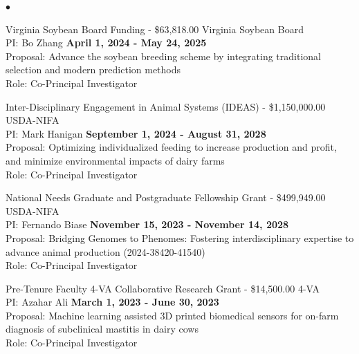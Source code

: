 \documentclass[margin,line,10pt]{res}
\newenvironment{list2}{
  \begin{list}{$\bullet$}{%
      \setlength{\itemsep}{0in}
      \setlength{\parsep}{0in} \setlength{\parskip}{0in}
      \setlength{\topsep}{0in} \setlength{\partopsep}{0in} 
      \setlength{\leftmargin}{0.2in}}}{\end{list}}
\begin{document}
\begin{resume}
\begin{list2}
  \item Virginia Soybean Board Funding  - \$63,818.00  \hfill Virginia Soybean Board \\
  PI: Bo Zhang  \hfill \textbf{April 1, 2024 - May 24, 2025}\\
Proposal: Advance the soybean breeding scheme by integrating traditional selection and modern prediction methods\\
Role: Co-Principal Investigator \\

\vspace{0.5cm}

 \item Inter-Disciplinary Engagement in Animal Systems (IDEAS)  - \$1,150,000.00  \hfill USDA-NIFA \\
 PI: Mark Hanigan  \hfill \textbf{September 1, 2024 - August 31, 2028}\\
 Proposal: Optimizing individualized feeding to increase production and profit, and minimize environmental impacts of dairy farms \\
 Role: Co-Principal Investigator \\

\vspace{0.5cm}


  \item National Needs Graduate and Postgraduate Fellowship Grant  - \$499,949.00  \hfill USDA-NIFA \\
  PI: Fernando Biase  \hfill \textbf{November 15, 2023 - November 14, 2028}\\
Proposal: Bridging Genomes to Phenomes: Fostering interdisciplinary expertise to advance animal production (2024-38420-41540)\\
Role: Co-Principal Investigator \\

\vspace{0.5cm}

  \item Pre-Tenure Faculty 4-VA Collaborative Research Grant - \$14,500.00  \hfill 4-VA \\
  PI: Azahar Ali  \hfill \textbf{March 1, 2023 - June 30, 2023}\\
Proposal: Machine learning assisted 3D printed biomedical sensors for on-farm diagnosis of subclinical mastitis in dairy cows  \\
Role: Co-Principal Investigator \\

\vspace{0.5cm}



\end{list2}
\end{resume}
\end{document}
